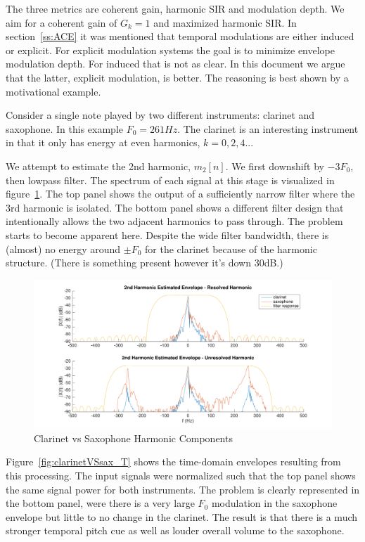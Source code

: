 \documentclass [11pt, proquest,oneside] {ganter_thesis}[2015/03/03]
\begin{document}
The three metrics are coherent gain, harmonic SIR and modulation depth.  We aim for a coherent gain of $G_k = 1$ and maximized harmonic SIR.  In section~\ref{ss:ACE} it was mentioned that temporal modulations are either induced or explicit.  For explicit modulation systems the goal is to minimize envelope modulation depth.  For induced that is not as clear.  In this document we argue that the latter, explicit modulation, is better.  The reasoning is best shown by a motivational example.

Consider a single note played by two different instruments: clarinet and saxophone.  In this example $F_0 = 261Hz$.  The clarinet is an interesting instrument in that it only has energy at even harmonics, $k = 0, 2, 4...$

We attempt to estimate the 2nd harmonic, $m_2[n]$.  We first downshift by $-3F_0$, then lowpass filter.  The spectrum of each signal at this stage is visualized in figure~\ref{fig:clarinetVSsax_F}.  The top panel shows the output of a sufficiently narrow filter where the 3rd harmonic is isolated.  The bottom panel shows a different filter design that intentionally allows the two adjacent harmonics to pass through.  The problem starts to become apparent here.  Despite the wide filter bandwidth, there is (almost) no energy around $\pm F_0$ for the clarinet because of the harmonic structure.  (There is something present however it's down 30dB.)

\begin{figure}[!ht]
  \centering
    \includegraphics[width=1\textwidth]{matlab/clarinetVSsax_F}
    \caption{Clarinet vs Saxophone Harmonic Components}\label{fig:clarinetVSsax_F}
\end{figure}

Figure~\ref{fig:clarinetVSsax_T} shows the time-domain envelopes resulting from this processing.  The input signals were normalized such that the top panel shows the same signal power for both instruments.  The problem is clearly represented in the bottom panel, were there is a very large $F_0$ modulation in the saxophone envelope but little to no change in the clarinet.  The result is that there is a much stronger temporal pitch cue as well as louder overall volume to the saxophone.
\end{document}
